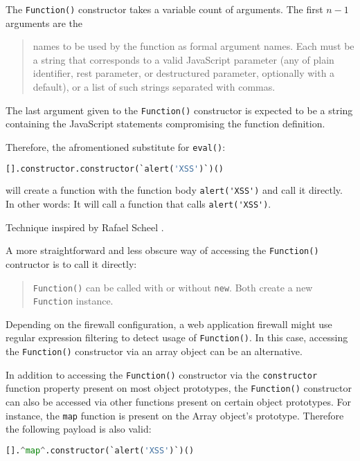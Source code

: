 The \verb|Function()| constructor takes a variable count of arguments. The first $n - 1$ arguments are the
\begin{quote}
	names to be used by the function as formal argument names. Each must be a string that corresponds to a valid JavaScript parameter (any of plain identifier, rest parameter, or destructured parameter, optionally with a default), or a list of such strings separated with commas. \cite{js/function}
\end{quote}
The last argument given to the \verb|Function()| constructor is expected to be a string containing the JavaScript statements compromising the function definition. \cite{js/function}

Therefore, the afromentioned substitute for \verb|eval()|:

\begin{lstlisting}[style=basicStyle,language=Python]
[].constructor.constructor(`alert('XSS')`)()
\end{lstlisting}

will create a function with the function body \verb|alert('XSS')| and call it directly.
In other words: It will call a function that calls \verb|alert('XSS')|.

Technique inspired by Rafael Scheel \cite{onecons/wafbypass}.

A more straightforward and less obscure way of accessing the \verb|Function()| contructor is to call it directly:
\begin{quote}
	\verb|Function()| can be called with or without \verb|new|. Both create a new \verb|Function| instance. \cite{js/function}
\end{quote}
Depending on the firewall configuration, a web application firewall might use regular expression filtering to detect usage of \verb|Function()|.
In this case, accessing the \verb|Function()| constructor via an array object can be an alternative.

In addition to accessing the \verb|Function()| constructor via the \verb|constructor| function property present on most object prototypes, the \verb|Function()| constructor can also be accessed via other functions present on certain object prototypes. For instance, the \verb|map| function is present on the Array object's prototype. Therefore the following payload is also valid:

\begin{lstlisting}[style=basicStyle,language=Python,escapeinside=\^\^]
[].^map^.constructor(`alert('XSS')`)()
\end{lstlisting}

